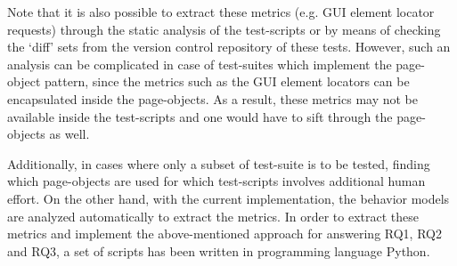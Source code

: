Note that it is also possible to extract these metrics (e.g. GUI element locator requests) through the static analysis of the test-scripts or by means of checking the `diff' sets from the version control repository of these tests. However, such an analysis can be complicated in case of test-suites which implement the page-object pattern, since the metrics such as the GUI element locators can be encapsulated inside the page-objects. As a result, these metrics may not be available inside the test-scripts and one would have to sift through the page-objects as well. 

Additionally, in cases where only a subset of test-suite is to be tested, finding which page-objects are used for which test-scripts involves additional  human effort. On the other hand, with the current implementation, the behavior models are analyzed automatically to extract the metrics. In order to extract these metrics and implement the above-mentioned approach for answering RQ1, RQ2 and RQ3, a set of scripts has been written in programming language Python. 

